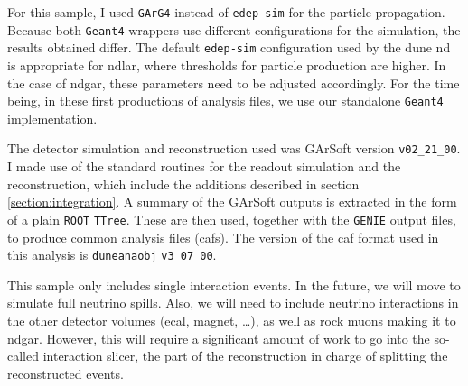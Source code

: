 For this sample, I used \texttt{GArG4} instead of \texttt{edep-sim} for the particle propagation. Because both \texttt{Geant4} wrappers use different configurations for the simulation, the results obtained differ. The default \texttt{edep-sim} configuration used by the \gls{dune} \gls{nd} is appropriate for \gls{ndlar}, where thresholds for particle production are higher. In the case of \gls{ndgar}, these parameters need to be adjusted accordingly. For the time being, in these first productions of analysis files, we use our standalone \texttt{Geant4} implementation.

The detector simulation and reconstruction used was GArSoft version \texttt{v02_21_00}. I made use of the standard routines for the readout simulation and the reconstruction, which include the additions described in section \ref{section:integration}. A summary of the GArSoft outputs is extracted in the form of a plain \texttt{ROOT} \texttt{TTree}. These are then used, together with the \texttt{GENIE} output files, to produce common analysis files (\gls{caf}s). The version of the \gls{caf} format used in this analysis is \texttt{duneanaobj} \texttt{v3_07_00}.

This sample only includes single interaction events. In the future, we will move to simulate full neutrino spills. Also, we will need to include neutrino interactions in the other detector volumes (\gls{ecal}, magnet, \dots), as well as rock muons making it to \gls{ndgar}. However, this will require a significant amount of work to go into the so-called interaction slicer, the part of the reconstruction in charge of splitting the reconstructed events.

